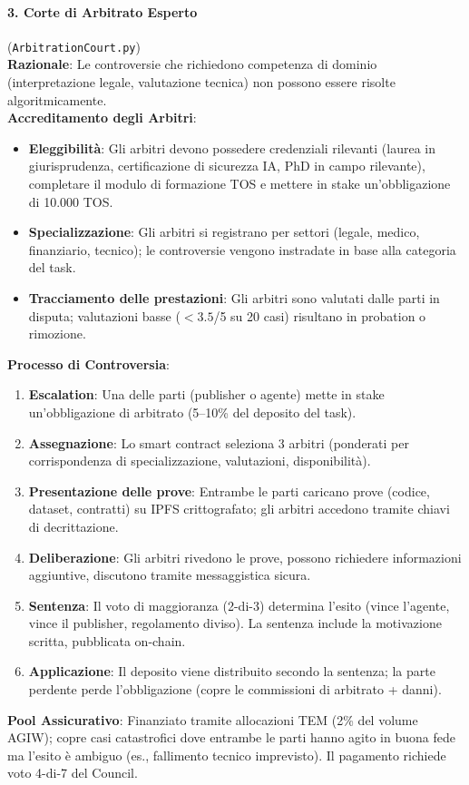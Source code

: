 \documentclass[11pt]{article}
\begin{document}
\paragraph{3. Corte di Arbitrato Esperto} (\texttt{ArbitrationCourt.py})\\
\textbf{Razionale}: Le controversie che richiedono competenza di dominio (interpretazione legale, valutazione tecnica) non possono essere risolte algoritmicamente.\\
\textbf{Accreditamento degli Arbitri}:
\begin{itemize}[noitemsep]
  \item \textbf{Eleggibilità}: Gli arbitri devono possedere credenziali rilevanti (laurea in giurisprudenza, certificazione di sicurezza IA, PhD in campo rilevante), completare il modulo di formazione TOS e mettere in stake un'obbligazione di 10.000 TOS.
  \item \textbf{Specializzazione}: Gli arbitri si registrano per settori (legale, medico, finanziario, tecnico); le controversie vengono instradate in base alla categoria del task.
  \item \textbf{Tracciamento delle prestazioni}: Gli arbitri sono valutati dalle parti in disputa; valutazioni basse ($<3.5$/5 su 20 casi) risultano in probation o rimozione.
\end{itemize}
\textbf{Processo di Controversia}:
\begin{enumerate}[noitemsep]
  \item \textbf{Escalation}: Una delle parti (publisher o agente) mette in stake un'obbligazione di arbitrato (5--10\% del deposito del task).
  \item \textbf{Assegnazione}: Lo smart contract seleziona 3 arbitri (ponderati per corrispondenza di specializzazione, valutazioni, disponibilità).
  \item \textbf{Presentazione delle prove}: Entrambe le parti caricano prove (codice, dataset, contratti) su IPFS crittografato; gli arbitri accedono tramite chiavi di decrittazione.
  \item \textbf{Deliberazione}: Gli arbitri rivedono le prove, possono richiedere informazioni aggiuntive, discutono tramite messaggistica sicura.
  \item \textbf{Sentenza}: Il voto di maggioranza (2-di-3) determina l'esito (vince l'agente, vince il publisher, regolamento diviso). La sentenza include la motivazione scritta, pubblicata on-chain.
  \item \textbf{Applicazione}: Il deposito viene distribuito secondo la sentenza; la parte perdente perde l'obbligazione (copre le commissioni di arbitrato + danni).
\end{enumerate}
\textbf{Pool Assicurativo}: Finanziato tramite allocazioni TEM (2\% del volume AGIW); copre casi catastrofici dove entrambe le parti hanno agito in buona fede ma l'esito è ambiguo (es., fallimento tecnico imprevisto). Il pagamento richiede voto 4-di-7 del Council.
\end{document}
